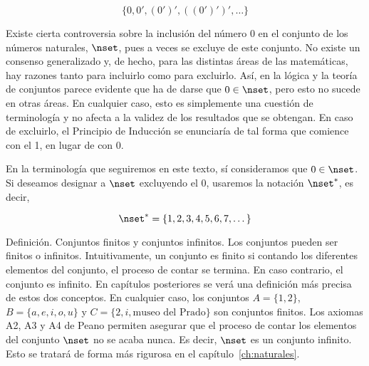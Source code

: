 \[ \{0, 0', (0')', ((0')')', \dots\} \]

Existe cierta controversia sobre la inclusión del número 0 en el conjunto de
los números naturales, $\nset$, pues a veces se excluye de este conjunto. No
existe un consenso generalizado y, de hecho, para las distintas áreas de las
matemáticas, hay razones tanto para incluirlo como para excluirlo. Así, en
la lógica y la teoría de conjuntos parece evidente que ha de darse que $0
\in \nset$, pero esto no sucede en otras áreas. En cualquier caso, esto es
simplemente una cuestión de terminología y no afecta a la validez de los
resultados que se obtengan. En caso de excluirlo, el Principio de Inducción
se enunciaría de tal forma que comience con el 1, en lugar de con 0.

En la terminología que seguiremos en este texto, sí consideramos que $0 \in
\nset$. Si deseamos designar a $\nset$ excluyendo el 0, usaremos la notación
$\nset^*$, es decir,

\[ \nset^* = \{1, 2, 3, 4, 5, 6, 7, \dots\} \]

Definición. Conjuntos finitos y conjuntos infinitos. Los conjuntos pueden
ser finitos o infinitos. Intuitivamente, un conjunto es finito si contando
los diferentes elementos del conjunto, el proceso de contar se termina. En
caso contrario, el conjunto es infinito. En capítulos posteriores se verá
una definición más precisa de estos dos conceptos. En cualquier caso, los
conjuntos $A = \{1, 2\}$, $B = \{a, e, i, o, u\}$ y $C = \{2, i, \text{museo
del Prado}\}$ son conjuntos finitos. Los axiomas A2, A3 y A4 de Peano
permiten asegurar que el proceso de contar los elementos del conjunto
$\nset$ no se acaba nunca. Es decir, $\nset$ es un conjunto infinito. Esto
se tratará de forma más rigurosa en el capítulo~\ref{ch:naturales}.



